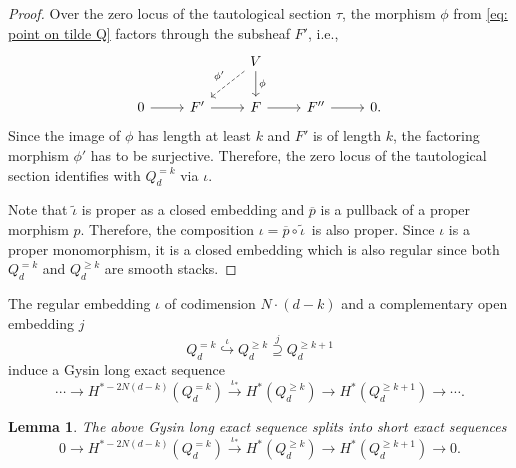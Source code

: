 \documentclass[10pt]{amsart}
\newcommand{\+}{{}^+}
\newtheorem {lemma}[theorem]{Lemma}
\theoremstyle{definition}
\theoremstyle {definition}
\theoremstyle {definition}
\begin{document}
\begin{proof}

Over the zero locus of the tautological section $\tau$, the morphism $\phi$ from \eqref{eq: point on tilde Q} factors through the subsheaf $F'$, i.e., 
\begin{equation}\label{eq: point on zero locus of tilde Q}
    \begin{tikzcd}
            &  &     V \arrow[d, "\phi"] \arrow[ld, dashed, "\phi'"']        &               &   \\
0 \arrow[r] & F' \arrow[r]           & F \arrow[r] & F'' \arrow[r] & 0.
\end{tikzcd}
\end{equation}
Since the image of $\phi$ has length at least $k$ and $F'$ is of length $k$, the factoring morphism $\phi'$ has to be surjective. Therefore, the zero locus of the tautological section identifies with $Q^{=k}_{d}$ via $\iota$. 

Note that $\widetilde \iota$ is proper as a closed embedding and $\overline{p}$ is a pullback of a proper morphism $p$. Therefore, the composition $\iota=\overline{p}\circ \widetilde{\iota}\,$ is also proper. Since $\iota$ is a proper monomorphism, it is a closed embedding which is also regular since both $Q^{=k}_d$ and $Q^{\geq k}_d$ are smooth stacks.

\end{proof}

The regular embedding $\iota$ of codimension $N\cdot (d-k)$ and a complementary open embedding $j$
$$Q^{=k}_d \overset{\iota}{\hookrightarrow} Q^{\geq k}_d \overset{j}{\supseteq} Q^{\geq k+1}_d
$$
induce a Gysin long exact sequence
\begin{equation*}
    \cdots \rightarrow H^{*-2N(d-k)}(Q^{=k}_d)\xrightarrow{\iota_*} H^*(Q^{\geq k}_d)\rightarrow H^*(Q^{\geq k+1}_d)\rightarrow \cdots. 
\end{equation*}

\begin{lemma}\label{lem: Gysin splitting}
The above Gysin long exact sequence splits into short exact sequences
$$0\rightarrow H^{*-2N(d-k)}(Q^{=k}_d)\xrightarrow{\iota_*} H^*(Q^{\geq k}_d)\rightarrow H^*(Q^{\geq k+1}_d)\rightarrow 0.$$
\end{lemma}
\end{document}
